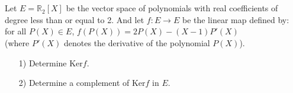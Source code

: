 \documentclass[12pt]{article}
\begin{document}
\begin{answerbox}
\end{answerbox}

\newpage  
\section{}
Let $E = \mathbb{R}_2[X]$ be the vector space of polynomials with real coefficients of degree less than or equal to 2. And let $f: E \rightarrow E$ be the linear map defined by:\\
for all $P(X) \in E$, $f(P(X)) = 2P(X) - (X - 1)P'(X)$\\
(where $P'(X)$ denotes the derivative of the polynomial $P(X)$).

\begin{enumerate}
    \item[1)] Determine $\text{Ker}f$.
    \item[2)] Determine a complement of $\text{Ker}f$ in $E$.
\end{enumerate}


\begin{answerbox}
\end{answerbox}

\end{document}
